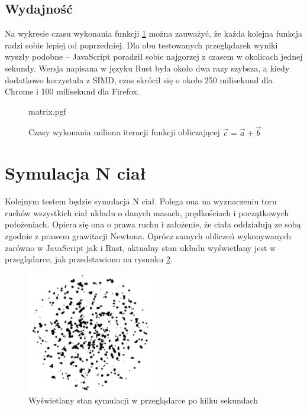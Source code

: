 \documentclass[language=polish,type=master]{aghmodern}
\begin{document}
\subsection{Wydajność}
Na wykresie czasu wykonania funkcji \ref{fig:matrix} można zauważyć, że każda kolejna funkcja radzi sobie lepiej od poprzedniej.
Dla obu testowanych przeglądarek wyniki wyszły podobne -- JavaScript poradził sobie najgorzej z czasem w okolicach jednej sekundy.
Wersja napisana w języku Rust była około dwa razy szybsza, a kiedy dodatkowo korzystała z SIMD, czas skrócił się o około 250 milisekund dla Chrome i 100 milisekund dla Firefox.

\begin{figure}[H]
    \centering
    {matrix.pgf}
    \caption{Czasy wykonania miliona iteracji funkcji obliczającej $\vec{c} = \vec{a} + \vec{b}$}
    \label{fig:matrix}
\end{figure}

\clearpage

\section{Symulacja N ciał}
Kolejnym testem będzie symulacja N ciał.
Polega ona na wyznaczeniu toru ruchów wszystkich ciał układu o danych masach, prędkościach i początkowych położeniach.
Opiera się ona o prawa ruchu i założenie, że ciała oddziałują ze sobą zgodnie z prawem grawitacji Newtona.
Oprócz samych obliczeń wykonywanych zarówno w JavaScript jak i Rust, aktualny stan układu wyświetlany jest w przeglądarce, jak przedstawiono na rysunku \ref{fig:nbody_screenshot}. 

\begin{figure}[H]
    \centering
    \includegraphics[width=0.5\textwidth]{images/nbody.pdf}
    \vspace*{15pt}
    \caption{Wyświetlany stan symulacji w przeglądarce po kilku sekundach}
    \label{fig:nbody_screenshot}
\end{figure}
\end{document}
